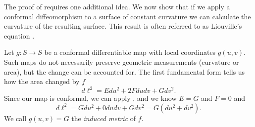 The proof of  requires one additional idea. We now show that if we apply a conformal diffeomorphism
to a surface of constant curvature
we can calculate the curvature of the resulting surface.
This result is often referred to as Liouville's equation \cite{deigard-2020,dubrovin_modern_1984,liouville1838}.






Let $g:S\to S$ be a conformal differentiable map with local coordinates $g(u,v)$.
Such maps do not necessarily preserve geometric measurements (curvature or area), but the change
can be accounted for. 
The first fundamental form tells us how the area changed by $f$
$$d\ell^2=Edu^2+2Fdudv + Gdv^2.$$
Since our map is conformal, we can apply ,
and we know $E=G$ and $F=0$ and 
$$d\ell^2=Gdu^2+0dudv + Gdv^2=G(du^2+dv^2).$$
We call $g(u,v)=G$ the \emph{induced metric} of $f$.


